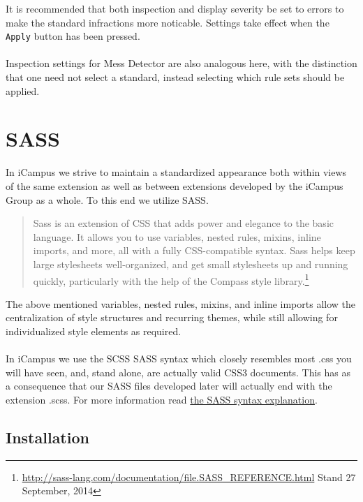 \documentclass[]{report}
\begin{document}
\noindent
It is recommended that both inspection and display severity be set to errors to make the standard infractions more noticable. Settings take effect when the \texttt{Apply} button has been pressed.\\
\\
Inspection settings for Mess Detector are also analogous here, with the distinction that one need not select a standard, instead selecting which rule sets should be applied.

\newpage
\section{SASS}

In iCampus we strive to maintain a standardized appearance both within views of the same extension as well as between extensions developed by the iCampus Group as a whole. To this end we utilize SASS.

\begin{quote}
	Sass is an extension of CSS that adds power and elegance to the basic language. It allows you to use variables, nested rules, mixins, inline imports, and more, all with a fully CSS-compatible syntax. Sass helps keep large stylesheets well-organized, and get small stylesheets up and running quickly, particularly with the help of the Compass style library.\footnote{\url{http://sass-lang.com/documentation/file.SASS_REFERENCE.html} Stand 27 September, 2014}
\end{quote}

The above mentioned variables, nested rules, mixins, and inline imports allow the centralization of style structures and recurring themes, while still allowing for individualized style elements as required.\\
\\
In iCampus we use the SCSS SASS syntax which closely resembles most .css you will have seen, and, stand alone, are actually valid CSS3 documents. This has as a consequence that our SASS files developed later will actually end with the extension .scss. For more information read \href{http://sass-lang.com/documentation/file.SASS_REFERENCE.html#syntax}{the SASS syntax explanation}.

\subsection{Installation}
\end{document}
